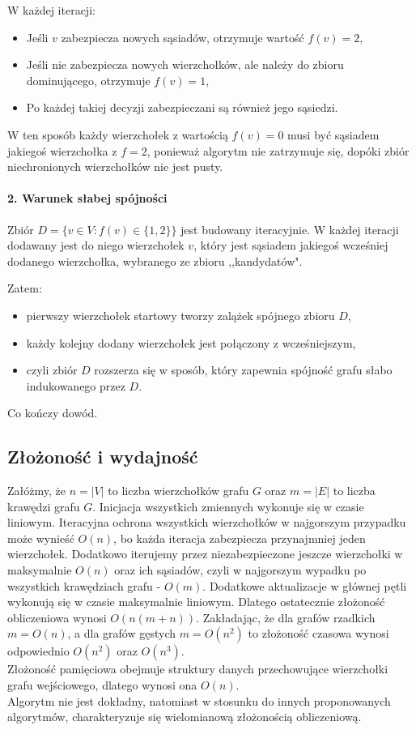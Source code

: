     W każdej iteracji:
    \begin{itemize}
        \item Jeśli $v$ zabezpiecza nowych sąsiadów, otrzymuje wartość $f(v) = 2$,
        \item Jeśli nie zabezpiecza nowych wierzchołków, ale należy do zbioru dominującego, otrzymuje $f(v) = 1$,
        \item Po każdej takiej decyzji zabezpieczani są również jego sąsiedzi.
    \end{itemize}

    W ten sposób każdy wierzchołek z wartością $f(v) = 0$ musi być sąsiadem jakiegoś wierzchołka z $f = 2$, ponieważ algorytm nie zatrzymuje się, dopóki zbiór niechronionych wierzchołków nie jest pusty.

    \paragraph{2. Warunek słabej spójności}

    Zbiór $D = \{v \in V : f(v) \in \{1,2\} \}$ jest budowany iteracyjnie. W każdej iteracji dodawany jest do niego wierzchołek $v$, który jest sąsiadem jakiegoś wcześniej dodanego wierzchołka, wybranego ze zbioru ,,kandydatów".

    Zatem:
    \begin{itemize}
        \item pierwszy wierzchołek startowy tworzy zalążek spójnego zbioru $D$,
        \item każdy kolejny dodany wierzchołek jest połączony z wcześniejszym,
        \item czyli zbiór $D$ rozszerza się w sposób, który zapewnia spójność grafu słabo indukowanego przez $D$.
    \end{itemize}
    Co kończy dowód.

    
    \subsection{Złożoność i wydajność}

    Załóżmy, że $n = |V|$ to liczba wierzchołków grafu $G$ oraz $m = |E|$ to liczba krawędzi grafu $G$. 
    Inicjacja wszystkich zmiennych wykonuje się w czasie liniowym. Iteracyjna ochrona wszystkich wierzchołków w najgorszym przypadku może wynieść $O(n)$, bo każda iteracja zabezpiecza przynajmniej jeden wierzchołek. Dodatkowo iterujemy przez niezabezpieczone jeszcze wierzchołki w maksymalnie $O(n)$ oraz ich sąsiadów, czyli w najgorszym wypadku po wszystkich krawędziach grafu - $O(m)$. Dodatkowe aktualizacje w głównej pętli wykonują się w czasie maksymalnie liniowym. Dlatego ostatecznie złożoność obliczeniowa wynosi $O(n(m+n))$. Zakładając, że dla grafów rzadkich $m=O(n)$, a dla grafów gęstych $m=O(n^2)$ to złożoność czasowa wynosi odpowiednio $O(n^2)$ oraz $O(n^3)$.\\
    Złożoność pamięciowa obejmuje struktury danych przechowujące wierzchołki grafu wejściowego, dlatego wynosi ona $O(n)$.\\
    Algorytm nie jest dokładny, natomiast w stosunku do innych proponowanych algorytmów, charakteryzuje się wielomianową złożonością obliczeniową.
    
